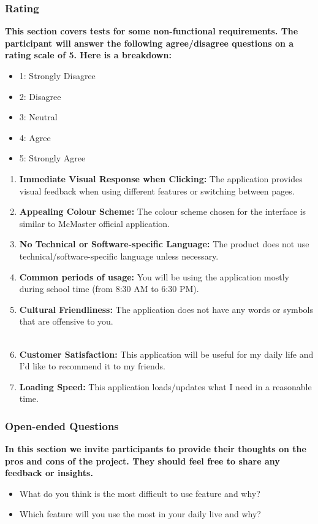 \documentclass[12pt, titlepage]{article}
\begin{document}
\subsubsection{Rating}
\textbf{This section covers tests for some non-functional requirements. The participant will answer the following agree/disagree questions on a rating scale of 5. Here is a breakdown:}
\begin{itemize}
\item 1: Strongly Disagree
\item 2: Disagree
\item 3: Neutral
\item 4: Agree
\item 5: Strongly Agree
\end{itemize}
\begin{enumerate}
	\item \textbf{Immediate Visual Response when Clicking:}  The application provides visual feedback when using different features or switching between pages.
	\item \textbf{Appealing Colour Scheme:} The colour scheme chosen for the interface is similar to McMaster official application.
	\item \textbf{No Technical or Software-specific Language:} The product does not use technical/software-specific language unless necessary.
	\item \textbf{Common periods of usage:} You will be using the application mostly during school time (from 8:30 AM to 6:30 PM).
	\item \textbf{Cultural Friendliness:} The application does not have any words or symbols that are offensive to you.\\\\
	\item \textbf{Customer Satisfaction:} This application will be useful for my daily life and I'd like to recommend it to my friends.
	\item \textbf{Loading Speed:} This application loads/updates what I need in a reasonable time.
\end{enumerate}
\subsubsection{Open-ended Questions}
\textbf{In this section we invite participants to provide their thoughts on the pros and cons of the project. They should feel free to share any feedback or insights.}
\begin{itemize}
\item What do you think is the most difficult to use feature and why?
\item Which feature will you use the most in your daily live and why?
\end{itemize}
\newpage{}
\end{document}
